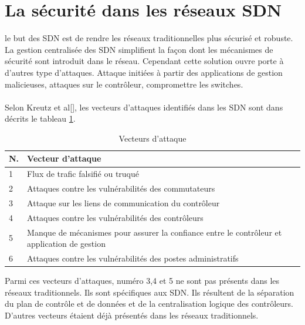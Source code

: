\section{La sécurité dans les réseaux SDN}
le but des SDN est de rendre les réseaux traditionnelles plus sécurisé et robuste. La gestion centralisée des SDN simplifient la façon dont les mécanismes de sécurité sont introduit dans le réseau. Cependant cette solution ouvre porte à d'autres type d'attaques. Attaque initiées à partir des applications de gestion malicieuses, attaques sur le contrôleur, compromettre les switches.\\\\
Selon Kreutz et al[\cite{7}], les vecteurs d'attaques identifiés dans les SDN sont dans décrits le tableau \ref{table:Threat_Vectors}.
\newpage
\begin{table}[h]
\begin{center}
\begin{tabular}{  m{0.5cm} m{11cm} }
\hline
\textbf{N}. & \textbf{Vecteur d'attaque}\\
\hline
1 & Flux de trafic falsifié ou truqué\\
2 & Attaques contre les vulnérabilités des commutateurs\\
3 & Attaque sur les liens de communication du contrôleur\\
4 & Attaques contre les vulnérabilités des contrôleurs\\
5 & Manque de mécanismes pour assurer la confiance entre le contrôleur
et application de gestion\\
6 & Attaques contre les vulnérabilités des postes administratifs\\
\hline
\end{tabular}
\caption{Vecteurs d'attaque}
\label{table:Threat_Vectors}
\end{center}
\end{table}

Parmi ces vecteurs d'attaques, numéro 3,4 et 5 ne sont pas présents dans les réseaux traditionnels. Ils sont spécifiques aux SDN. Ils résultent de la séparation du plan de contrôle et de données et de la centralisation logique des contrôleurs. D'autres vecteurs étaient déjà présentés dans les réseaux traditionnels.

